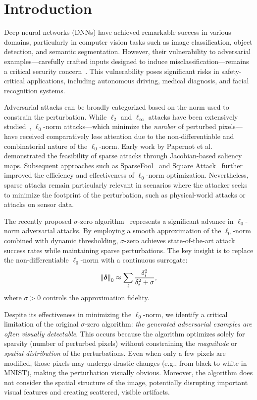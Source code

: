 \section{Introduction}
\label{sec:introduction}

Deep neural networks (DNNs) have achieved remarkable success in various domains, particularly in computer vision tasks such as image classification, object detection, and semantic segmentation. However, their vulnerability to adversarial examples---carefully crafted inputs designed to induce misclassification---remains a critical security concern~\cite{szegedy2014intriguing, goodfellow2015explaining}. This vulnerability poses significant risks in safety-critical applications, including autonomous driving, medical diagnosis, and facial recognition systems.

Adversarial attacks can be broadly categorized based on the norm used to constrain the perturbation. While $\ell_2$ and $\ell_\infty$ attacks have been extensively studied~\cite{madry2018towards, carlini2017towards, rony2019decoupling}, $\ell_0$-norm attacks---which minimize the \emph{number} of perturbed pixels---have received comparatively less attention due to the non-differentiable and combinatorial nature of the $\ell_0$-norm. Early work by Papernot et al.~\cite{papernot2016limitations} demonstrated the feasibility of sparse attacks through Jacobian-based saliency maps. Subsequent approaches such as SparseFool~\cite{modas2019sparsefool} and Square Attack~\cite{andriushchenko2020square} further improved the efficiency and effectiveness of $\ell_0$-norm optimization. Nevertheless, sparse attacks remain particularly relevant in scenarios where the attacker seeks to minimize the footprint of the perturbation, such as physical-world attacks or attacks on sensor data.

The recently proposed $\sigma$-zero algorithm~\cite{cina2025sigma} represents a significant advance in $\ell_0$-norm adversarial attacks. By employing a smooth approximation of the $\ell_0$-norm combined with dynamic thresholding, $\sigma$-zero achieves state-of-the-art attack success rates while maintaining sparse perturbations. The key insight is to replace the non-differentiable $\ell_0$-norm with a continuous surrogate:
\begin{equation}
    \left\|\boldsymbol{\delta}\right\|_0 \approx \sum_{i} \frac{\delta_i^2}{\delta_i^2 + \sigma},
\end{equation}
where $\sigma > 0$ controls the approximation fidelity.

Despite its effectiveness in minimizing the $\ell_0$-norm, we identify a critical limitation of the original $\sigma$-zero algorithm: \emph{the generated adversarial examples are often visually detectable}. This occurs because the algorithm optimizes solely for sparsity (number of perturbed pixels) without constraining the \emph{magnitude} or \emph{spatial distribution} of the perturbations. Even when only a few pixels are modified, those pixels may undergo drastic changes (e.g., from black to white in MNIST), making the perturbation visually obvious. Moreover, the algorithm does not consider the spatial structure of the image, potentially disrupting important visual features and creating scattered, visible artifacts.

